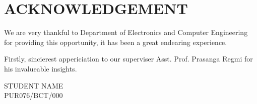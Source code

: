 \chapter*{ACKNOWLEDGEMENT}

We are very thankful to Department of Electronics and Computer Engineering for providing this opportunity, it has been a great endearing experience. 

Firstly, sincierest appericiation to our superviser Asst. Prof. Prasanga Regmi for his invalueable insights. 







\vspace{1cm}
STUDENT NAME\\
PUR076/BCT/000


